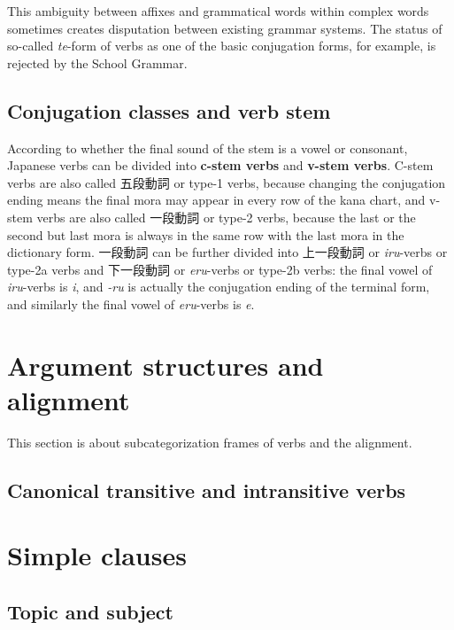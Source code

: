 \documentclass[UTF8, a4paper, oneside, scheme=plain]{ctexart}
\newcommand*{\concept}[1]{\textbf{#1}}
\newcommand{\corpus}[1]{\emph{#1}}
\begin{document}
This ambiguity between affixes and grammatical words within complex words sometimes creates
disputation between existing grammar systems.
The status of so-called \corpus{te}-form of verbs as one of the basic conjugation forms, for example,
is rejected by the School Grammar.

\subsection{Conjugation classes and verb stem}

According to whether the final sound of the stem is a vowel or consonant,
Japanese verbs can be divided into \concept{c-stem verbs} and \concept{v-stem verbs}.
C-stem verbs are also called 五段動詞 or type-1 verbs,
because changing the conjugation ending means the final mora may appear in every row of the kana chart, 
and v-stem verbs are also called 一段動詞 or type-2 verbs,
because the last or the second but last mora is always in the same row with the last mora in the dictionary form.
一段動詞 can be further divided into 上一段動詞 or \corpus{iru}-verbs or type-2a verbs
and 下一段動詞 or \corpus{eru}-verbs or type-2b verbs:
the final vowel of \corpus{iru}-verbs is \corpus{i},
and \corpus{-ru} is actually the conjugation ending of the terminal form,
and similarly the final vowel of \corpus{eru}-verbs is \corpus{e}.

\section{Argument structures and alignment}\label{sec:arguments}

This section is about subcategorization frames of verbs and the alignment.

\subsection{Canonical transitive and intransitive verbs}

\section{Simple clauses}

\subsection{Topic and subject}\label{sec:topic-subject}
\end{document}
